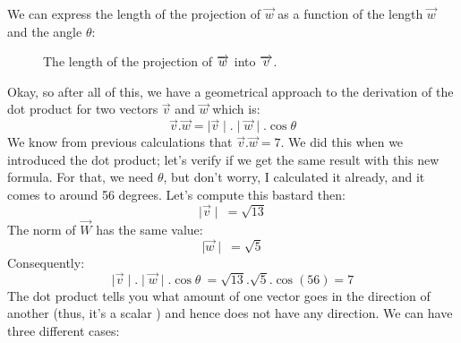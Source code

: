 \documentclass[a4,12pt,twosided,openany]{memoir}
\begin{document}
We can express the length of the projection of $\overrightarrow{w}$ as a function of the length $\overrightarrow{w}$ and the angle $\theta$:
\begin{figure}[h!]
\begin{center}
\end{center}
\vspace*{5pt}
\caption{The length of the projection of $\protect\overrightarrow{w}$ into $\protect\overrightarrow{v}$.}\label{fig:projec}
\end{figure}
\par 
\indent
Okay, so after all of this, we have a geometrical approach to the derivation of the dot product for two vectors $\overrightarrow{v}$ and $\overrightarrow{w}$ which is:
\[ \overrightarrow{v}.\overrightarrow{w} = \mid \overrightarrow{v} \mid.\mid \overrightarrow{w}\mid.\cos\theta\]
We know from previous calculations that $\overrightarrow{v}.\overrightarrow{w}=7$. We did this when we introduced the dot product; let’s verify if we get the same result with this new formula. For that, we need $\theta$, but don’t worry, I calculated it already, and it comes to around 56 degrees. Let’s compute this bastard then:
\[\mid \overrightarrow{v} \mid\ = \sqrt{13}\]
The norm of $\overrightarrow{W}$ has the same value:
\[\mid \overrightarrow{w} \mid\ = \sqrt{5}\]
Consequently:
\[\mid \overrightarrow{v} \mid.\mid \overrightarrow{w}\mid.\cos\theta\ = \sqrt{13}.\sqrt{5}.\cos(56) = 7 \]
The dot product tells you what amount of one vector goes in the direction of another (thus, it’s a scalar ) and hence does not have any direction. We can have three different cases: 
\end{document}
